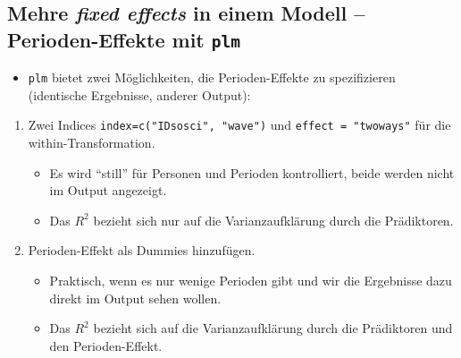 \documentclass[
]{book}
\newenvironment{Shaded}{\begin{snugshade}}{\end{snugshade}}
\newcommand{\DataTypeTok}[1]{\textcolor[rgb]{0.13,0.29,0.53}{#1}}
\newcommand{\KeywordTok}[1]{\textcolor[rgb]{0.13,0.29,0.53}{\textbf{#1}}}
\newcommand{\NormalTok}[1]{#1}
\newcommand{\OperatorTok}[1]{\textcolor[rgb]{0.81,0.36,0.00}{\textbf{#1}}}
\newcommand{\StringTok}[1]{\textcolor[rgb]{0.31,0.60,0.02}{#1}}
\providecommand{\tightlist}{%
  \setlength{\itemsep}{0pt}\setlength{\parskip}{0pt}}
\begin{document}
\hypertarget{mehre-fixed-effects-in-einem-modell-perioden-effekte-mit-plm}{%
\subsection*{\texorpdfstring{Mehre \emph{fixed effects} in einem Modell -- Perioden-Effekte mit \texttt{plm}}{Mehre fixed effects in einem Modell -- Perioden-Effekte mit plm}}\label{mehre-fixed-effects-in-einem-modell-perioden-effekte-mit-plm}}

\begin{itemize}
\tightlist
\item
  \texttt{plm} bietet zwei Möglichkeiten, die Perioden-Effekte zu spezifizieren (identische Ergebnisse, anderer Output):
\end{itemize}

\begin{enumerate}
\def\labelenumi{\arabic{enumi})}
\tightlist
\item
  Zwei Indices \texttt{index=c("IDsosci",\ "wave")} und \texttt{effect\ =\ "twoways"} für die within-Transformation.

  \begin{itemize}
  \tightlist
  \item
    Es wird ``still'' für Personen und Perioden kontrolliert, beide werden nicht im Output angezeigt.
  \item
    Das \(R^2\) bezieht sich nur auf die Varianzaufklärung durch die Prädiktoren.
  \end{itemize}
\item
  Perioden-Effekt als Dummies hinzufügen.

  \begin{itemize}
  \tightlist
  \item
    Praktisch, wenn es nur wenige Perioden gibt und wir die Ergebnisse dazu direkt im Output sehen wollen.
  \item
    Das \(R^2\) bezieht sich auf die Varianzaufklärung durch die Prädiktoren und den Perioden-Effekt.
  \end{itemize}
\end{enumerate}

\begin{Shaded}
\end{Shaded}
\end{document}
